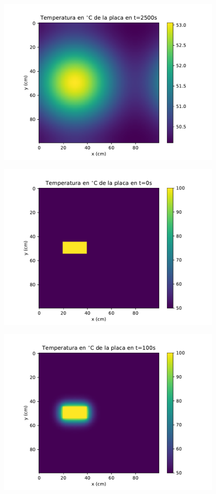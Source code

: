 \documentclass[12pt,letterpaper]{article}
\begin{document}
\begin{figure}[ht]
\includegraphics{p1_2500.pdf}
\centering
\end{figure}

\begin{figure}[ht]
\includegraphics{p2_0.pdf}
\centering
\end{figure}

\begin{figure}[ht]
\includegraphics{p2_100.pdf}
\centering
\end{figure}
\end{document}
